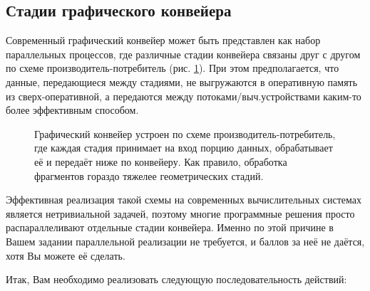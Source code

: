 \documentclass[12pt,subf,href,colorlinks=true]{article}
\begin{document}
\subsection{Стадии графического конвейера}

Современный графический конвейер может быть представлен как набор параллельных процессов, где различные стадии конвейера связаны друг с другом по схеме производитель-потребитель (рис. \ref{fig:prodcons}). При этом предполагается, что данные, передающиеся между стадиями, не выгружаются в оперативную память из сверх-оперативной, а передаются между потоками/выч.устройствами каким-то более эффективным способом.

\begin{figure}[h]
	\caption{Графический конвейер устроен по схеме производитель-потребитель, где каждая стадия принимает на вход порцию данных, обрабатывает её и передаёт ниже по конвейеру. Как правило, обработка фрагментов гораздо тяжелее геометрических стадий. }
	\label{fig:prodcons}
\end{figure}

Эффективная реализация такой схемы на современных вычислительных системах является нетривиальной задачей, поэтому многие программные решения просто распараллеливают отдельные стадии конвейера. Именно по этой причине в Вашем задании параллельной реализации не требуется, и баллов за неё не даётся, хотя Вы можете её сделать.

Итак, Вам необходимо реализовать следующую последовательность действий:
\end{document}
